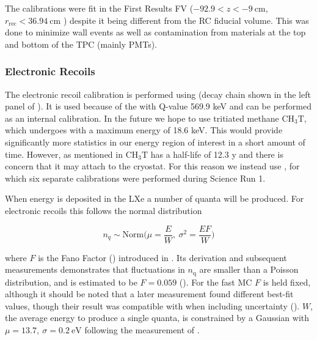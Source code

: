 The calibrations were fit in the First Results FV ($-92.9 < z < -9\ \mathrm{cm}$, $r_{\mathrm{rec}} < 36.94\ \mathrm{cm}$
) despite it being different from the RC fiducial volume.  This was done to minimize wall
events as well as contamination from materials at the top and bottom of the TPC (mainly PMTs).



\subsubsection{Electronic Recoils}
\label{subsubsec:er_nr_calibrations_parameter_determ_er}
The electronic recoil calibration is performed using  (decay chain shown in the left panel of
).  It is used because of the  \betadecay with Q-value 569.9 keV and can be performed
as an internal calibration.  In the future we hope to use tritiated methane $\mathrm{C H_3 T}$, which undergoes \betadecay
with a maximum energy of 18.6 keV.  This would provide significantly more statistics in our energy region of interest in a short amount
of time.  However, as mentioned in  $\mathrm{C H_3 T}$ has a half-life of 12.3 y and there
is concern that it may attach to the cryostat.  For this reason we instead use , for which six separate calibrations were
performed during Science Run 1.

When energy is deposited in the LXe a number of quanta will be produced.  For electronic recoils this follows the normal distribution

\begin{equation}
n_q \sim \mathrm{Norm} \bigg( \mu = \frac{E}{W},\ \sigma^2 = \frac{E F}{W} \bigg)
\label{eq:er_nr_calibrations_parameter_determ_er_quanta}
\end{equation}

\noindent where $F$ is the Fano Factor () introduced in .  Its derivation and subsequent measurements
demonstrates
that fluctuations in $n_{\mathrm{q}}$ are smaller than a Poisson distribution, and is estimated to be $F = 0.059$ ().  For the
fast MC $F$ is held fixed, although it should be noted that a later measurement found different best-fit values, though their result was
compatible with  when including uncertainty ().  $W$, the average energy to produce a single
quanta, is constrained by a Gaussian with $\mu = 13.7,\ \sigma = 0.2\ \mathrm{eV}$ following the measurement of .

